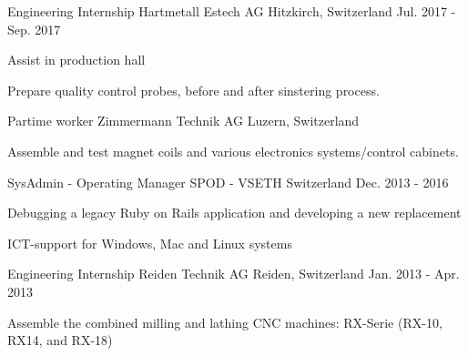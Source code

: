 \begin{cventries}
\cventry
{Engineering Internship} %
{Hartmetall Estech AG} %
{Hitzkirch, Switzerland} %
{Jul. 2017 - Sep. 2017} %
{
	\begin{cvitems} %
		\item {Assist in production hall}
    \item {Prepare quality control probes, before and after sinstering process.}
	\end{cvitems}
}

\cventry
  {Partime worker} %
  {Zimmermann Technik AG} %
  {Luzern, Switzerland} %
  {} %
  {
    \begin{cvitems} %
      \item {Assemble and test magnet coils and various electronics systems/control cabinets.}
    \end{cvitems}
  } 


  \cventry
    {SysAdmin - Operating Manager} %
    {SPOD - VSETH} %
    {Switzerland} %
    {Dec. 2013 - 2016} %
    {
      \begin{cvitems} %
        \item {Debugging a legacy Ruby on Rails application and developing a new replacement}
        \item {ICT-support for Windows, Mac and Linux systems}
      \end{cvitems}
    }

  \cventry
    {Engineering Internship} %
    {Reiden Technik AG} %
    {Reiden, Switzerland} %
    {Jan. 2013 - Apr. 2013} %
    {
      \begin{cvitems} %
        \item {Assemble the combined milling and lathing CNC machines: RX-Serie (RX-10, RX14, and RX-18)}
      \end{cvitems}
    }


\end{cventries}
